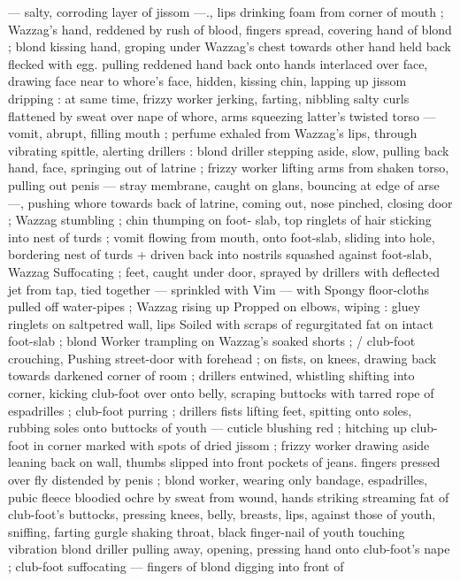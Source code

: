 --- salty, corroding layer of jissom ---., lips drinking foam from corner
of mouth ; Wazzag’s hand, reddened by rush of blood, fingers
spread, covering hand of blond ; blond kissing hand, groping under
Wazzag's chest towards other hand held back flecked with egg.
pulling reddened hand back onto hands interlaced over face, drawing
face near to whore's face, hidden, kissing chin, lapping up jissom
dripping : at same time, frizzy worker jerking, farting, nibbling salty
curls flattened by sweat over nape of whore, arms squeezing latter's
twisted torso --- vomit, abrupt, filling mouth ; perfume exhaled from
Wazzag's lips, through vibrating spittle, alerting drillers : blond
driller stepping aside, slow, pulling back hand, face, springing out of
latrine ; frizzy worker lifting arms from shaken torso, pulling out
penis --- stray membrane, caught on glans, bouncing at edge of arse
---, pushing whore towards back of latrine, coming out, nose
pinched, closing door ; Wazzag stumbling ; chin thumping on foot-
slab, top ringlets of hair sticking into nest of turds ; vomit flowing
from mouth, onto foot-slab, sliding into hole, bordering nest of turds
+ driven back into nostrils squashed against foot-slab, Wazzag
Suffocating ; feet, caught under door, sprayed by drillers with
deflected jet from tap, tied together --- sprinkled with Vim --- with
Spongy floor-cloths pulled off water-pipes ; Wazzag rising up
Propped on elbows, wiping : gluey ringlets on saltpetred wall, lips
Soiled with scraps of regurgitated fat on intact foot-slab ; blond
Worker trampling on Wazzag's soaked shorts ; / club-foot crouching,
Pushing street-door with forehead ; on fists, on knees, drawing back
towards darkened corner of room ; drillers entwined, whistling
shifting into corner, kicking club-foot over onto belly, scraping
buttocks with tarred rope of espadrilles ; club-foot purring ; drillers
fists lifting feet, spitting onto soles, rubbing soles onto buttocks of
youth --- cuticle blushing red ; hitching up club-foot in corner
marked with spots of dried jissom ; frizzy worker drawing aside
leaning back on wall, thumbs slipped into front pockets of jeans.
fingers pressed over fly distended by penis ; blond worker, wearing
only bandage, espadrilles, pubic fleece bloodied ochre by sweat from
wound, hands striking streaming fat of club-foot's buttocks, pressing
knees, belly, breasts, lips, against those of youth, sniffing, farting
gurgle shaking throat, black finger-nail of youth touching vibration
blond driller pulling away, opening, pressing hand onto club-foot's
nape ; club-foot suffocating --- fingers of blond digging into front of

